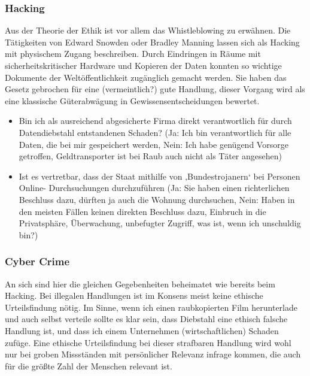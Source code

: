 \documentclass[letterpaper, 12pt]{article}
\let\tempsubsubsection\subsubsection
\renewcommand\subsubsection[1]{\vspace{0cm}\tempsubsubsection{#1}\vspace{0cm}}
\begin{document}
\subsubsection{Hacking}

Aus der Theorie der Ethik ist vor allem das Whistleblowing zu
erwähnen. Die Tätigkeiten von Edward Snowden oder Bradley Manning lassen sich als Hacking mit
physischem Zugang beschreiben. Durch Eindringen in Räume mit sicherheitskritischer Hardware und
Kopieren der Daten konnten so wichtige Dokumente der Weltöffentlichkeit zugänglich gemacht
werden. Sie haben das Gesetz gebrochen für eine (vermeintlich?) gute Handlung, dieser Vorgang
wird als eine klassische Güterabwägung in Gewissensentscheidungen bewertet.

\begin{itemize}
	\item Bin ich als ausreichend abgesicherte Firma direkt verantwortlich für durch Datendiebstahl
entstandenen Schaden?
(Ja: Ich bin verantwortlich für alle Daten, die bei mir gespeichert werden, Nein: Ich habe
genügend Vorsorge getroffen, Geldtransporter ist bei Raub auch nicht als Täter angesehen)
	\item Ist es vertretbar, dass der Staat mithilfe von ‚Bundestrojanern‘ bei Personen Online-
Durchsuchungen durchzuführen
(Ja: Sie haben einen richterlichen Beschluss dazu, dürften ja auch die Wohnung durchsuchen,
Nein: Haben in den meisten Fällen keinen direkten Beschluss dazu, Einbruch in die
Privatsphäre, Überwachung, unbefugter Zugriff, was ist, wenn ich unschuldig bin?)
\end{itemize}

\clearpage

\subsubsection{Cyber Crime}

An sich sind hier die gleichen Gegebenheiten beheimatet wie bereits beim Hacking. Bei illegalen
Handlungen ist im Konsens meist keine ethische Urteilsfindung nötig. Im Sinne, wenn ich einen
raubkopierten Film herunterlade und auch selbst verteile sollte es klar sein, dass Diebstahl eine
ethisch falsche Handlung ist, und dass ich einem Unternehmen (wirtschaftlichen) Schaden zufüge.
Eine ethische Urteilsfindung bei dieser strafbaren Handlung wird wohl nur bei groben Missständen
mit persönlicher Relevanz infrage kommen, die auch für die größte Zahl der Menschen relevant ist.
\end{document}
